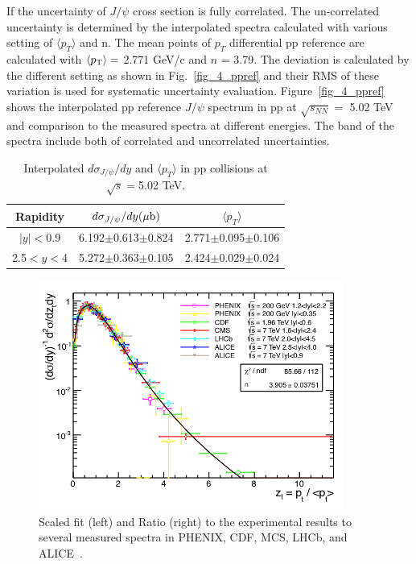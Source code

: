 If the uncertainty of $J/\psi$ cross section is fully correlated. 
The un-correlated uncertainty is determined by the interpolated spectra calculated with various setting of $\langle p_{T}\rangle$ and n. 
The mean points of $p_{T}$ differential pp reference are calculated with $\langle p_{\rm{T}}\rangle=$ 2.771 GeV/c and $n$ = 3.79. 
The deviation is calculated by the different setting as shown in Fig.~\ref{fig_4_ppref} and their RMS of these variation is used for systematic uncertainty evaluation. 
Figure~\ref{fig_4_ppref} shows the interpolated pp reference $J/\psi$ spectrum in pp at $\sqrt{s_{NN}}=$ 5.02 TeV and comparison to the measured spectra at different energies. 
The band of the spectra include both of correlated and uncorrelated uncertainties. 
\begin{table}
  \centering
  \begin{tabular}{ccc} \hline
    Rapidity   & $d\sigma_{J/\psi}/dy (\mu \rm{b})$  & $\langle p_{T} \rangle$ \\ \hline
    $|y|<$0.9  & 6.192$\pm$0.613$\pm$0.824  & 2.771$\pm$0.095$\pm$0.106 \\
    2.5$<y<$4  & 5.272$\pm$0.363$\pm$0.105  & 2.424$\pm$0.029$\pm$0.024 \\ \hline
  \end{tabular}
  \caption{Interpolated $d\sigma_{J/\psi}/dy$ and $\langle p_{T}\rangle$ in pp collisions at $\sqrt{s}=$5.02 TeV.}
  \label{table_4_pprefvalue}
\end{table}


\begin{figure}[!h]
  \centering
  \includegraphics[width=10cm]{chap4/figure/ppref/univfit.png}
  \caption{Scaled fit (left) and Ratio (right) to the experimental results to several measured spectra in PHENIX, CDF, MCS, LHCb, and ALICE~\cite{bib_jpsippref}. 
  }
  \label{fig_4_ppfit}
\end{figure}

